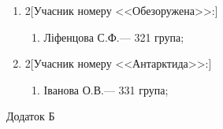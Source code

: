 \documentclass[
	a4paper,
	12pt,
	oneside,
	draft
]{extreport}
\begin{document}
\begin{enumerate}[topsep=0pt,itemsep=-1ex,partopsep=1ex,parsep=1ex]
\item 
\begin{multicols}{2}[Учасник номеру <<Обезоружена>>:] 
\begin{enumerate}[topsep=0pt,itemsep=-1ex,partopsep=1ex,parsep=1ex,label=\arabic*.]
\item Ліфенцова С.Ф.\hfill --- 321 група;
\end{enumerate}
\end{multicols}

\item 
\begin{multicols}{2}[Учасник номеру <<Антарктида>>:] 
\begin{enumerate}[topsep=0pt,itemsep=-1ex,partopsep=1ex,parsep=1ex,label=\arabic*.]
\item Іванова О.В.\hfill --- 331 група;
\end{enumerate}
\end{multicols}


\end{enumerate}
\newpage
\hfill Додаток Б
\end{document}
